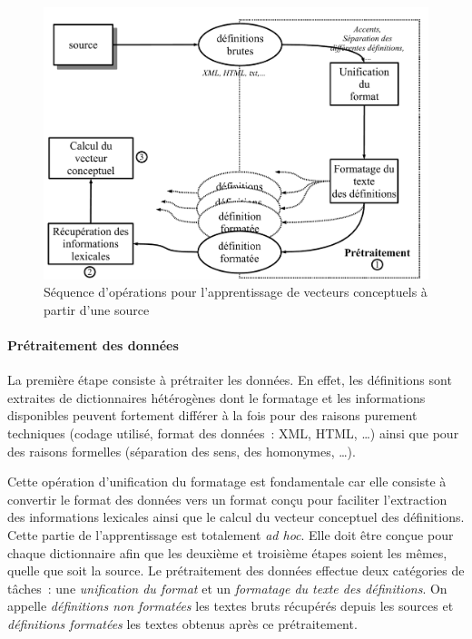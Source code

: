 \begin{figure}[h]
  \centering\includegraphics[width=16cm]{2_Etat-art/img/sequences_trait_source}
\caption{Séquence d'opérations pour l'apprentissage de vecteurs
  conceptuels à partir d'une source}
\label{fig:seq-trait-source}
\end{figure}

\paragraph{Prétraitement des données}

La première étape consiste à prétraiter les données. En effet, les
définitions sont extraites de dictionnaires hétérogènes dont le
formatage et les informations disponibles peuvent fortement différer à
la fois pour des raisons purement techniques (codage utilisé, format
des données~: XML, HTML, \ldots) ainsi que pour des raisons formelles
(séparation des sens, des homonymes, \ldots).

Cette opération d'unification du formatage est fondamentale car elle
consiste à convertir le format des données vers un format conçu pour
faciliter l'extraction des informations lexicales ainsi que le calcul
du vecteur conceptuel des définitions. Cette partie de l'apprentissage
est totalement \emph{ad hoc}. Elle doit être conçue pour chaque
dictionnaire afin que les deuxième et troisième étapes soient les
mêmes, quelle que soit la source. Le prétraitement des données
effectue deux catégories de tâches~: une \emph{unification du format}
et un \emph{formatage du texte des définitions}. On appelle
\emph{définitions non formatées} les textes bruts récupérés depuis les
sources et \emph{définitions formatées} les textes obtenus après ce
prétraitement.

